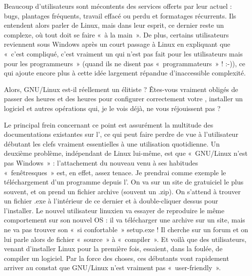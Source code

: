 Beaucoup d'utilisateurs sont mécontents des services offerts par leur  actuel : bugs, plantages fréquents, travail effacé ou perdu et formatages récurrents. Ils entendent alors parler de Linux, mais dans leur esprit, ce dernier reste un  complexe, où tout doit se faire «~à la main~». De plus, certains utilisateurs reviennent sous Windows après un court passage à Linux en expliquant que «~c'est compliqué, c'est vraiment un  qui n'est pas fait pour les utilisateurs mais pour les programmeurs~» (quand ils ne disent pas «~programmateurs~» ! :-)), ce qui ajoute encore plus à cette idée largement répandue d'inaccessible complexité.\par
Alors, GNU/Linux est-il réellement un  élitiste ? Êtes-vous vraiment obligés de passer des heures et des heures pour configurer correctement votre , installer un logiciel et autres opérations qui, je le vois déjà, ne vous réjouissent pas ?\par
Le principal frein concernant ce point est assurément la multitude des documentations existantes sur l', ce qui peut faire perdre de vue à l'utilisateur débutant les clefs vraiment essentielles à une utilisation quotidienne. Un deuxième problème, indépendant de Linux lui-même, est que «~GNU/Linux n'est pas Windows~» : l'attachement du nouveau venu à ses habitudes «~fenêtresques~» est, en effet, assez tenace. Je prendrai comme exemple le téléchargement d'un programme depuis l'. On va sur un site de gratuiciel le plus souvent, et on prend un fichier archive (souvent un .zip). On s'attend à trouver un fichier .exe à l'intérieur de ce dernier et à double-cliquer dessus pour l'installer. Le nouvel utilisateur linuxien va essayer de reproduire le même comportement sur son nouvel OS : il va télécharger une archive sur un site, mais ne va pas trouver son «~si confortable~» setup.exe ! Il cherche sur un forum et on lui parle alors de fichier «~source~» à «~compiler~». Et voilà que des utilisateurs, venant d'installer Linux pour la première fois, essaient, dans la foulée, de compiler un logiciel. Par la force des choses, ces débutants vont rapidement arriver au constat que GNU/Linux n'est vraiment pas «~user-friendly~».\par
